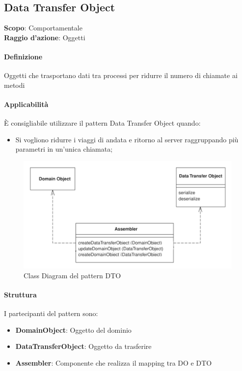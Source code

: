 \subsection{Data Transfer Object}
\label{data-transfer-object}

\textbf{Scopo}: Comportamentale \\
\textbf{Raggio d'azione}: Oggetti

\paragraph{Definizione} Oggetti che trasportano dati tra processi per ridurre il numero di chiamate ai metodi

\paragraph{Applicabilità} È consigliabile utilizzare il pattern Data Transfer Object quando:
\begin{itemize}
    \item Si vogliono ridurre i viaggi di andata e ritorno al server raggruppando più parametri in un’unica chiamata;
\end{itemize}

\begin{figure}[H]
    \centering
    \includegraphics[width=0.75\linewidth]{assets/pattern/dto/dto-struttura.png}
    \caption{Class Diagram del pattern DTO}
\end{figure}

\paragraph{Struttura} I partecipanti del pattern sono:
\begin{itemize}
    \item \textbf{DomainObject}: Oggetto del dominio
    \item \textbf{DataTransferObject}: Oggetto da trasferire
    \item \textbf{Assembler}: Componente che realizza il mapping tra DO e DTO
\end{itemize}

\newpage